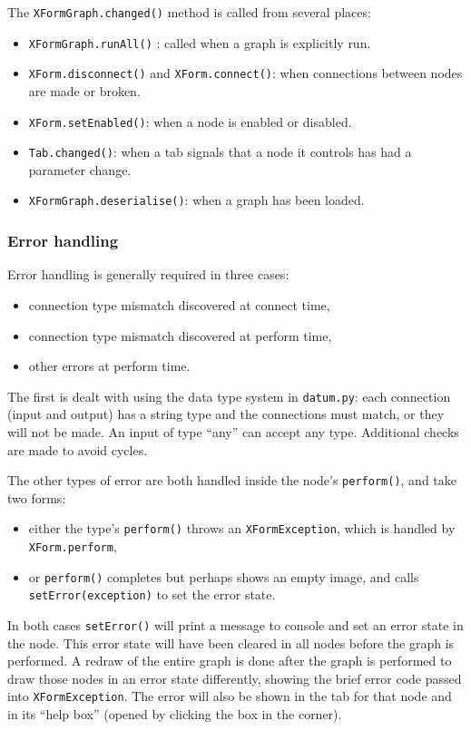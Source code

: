 The \texttt{XFormGraph.changed()} method is called from several places:
\begin{itemize}
\item \texttt{XFormGraph.runAll()} : called when a graph is explicitly run.
\item \texttt{XForm.disconnect()} and \texttt{XForm.connect()}: when connections between nodes are made or broken.
\item \texttt{XForm.setEnabled()}: when a node is enabled or disabled.
\item \texttt{Tab.changed()}: when a tab signals that a node it controls has had a parameter change.
\item \texttt{XFormGraph.deserialise()}: when a graph has been loaded.
\end{itemize}

\subsubsection{Error handling}
\label{errorhandling}
Error handling is generally required in three cases:
\begin{itemize}
\item connection type mismatch discovered at connect time,
\item connection type mismatch discovered at perform time,
\item other errors at perform time.
\end{itemize}
The first is dealt with using the data type system
in \texttt{datum.py}: each connection (input and output) has a string
type and the connections must match, or they will not be made. An input
of type ``any'' can accept any type. Additional checks are made to avoid
cycles.

The other types of error are both handled inside the node's \texttt{perform()},
and take two forms:
\begin{itemize}
\item either the type's \texttt{perform()} throws an \texttt{XFormException}, which
is handled by \texttt{XForm.perform},
\item or \texttt{perform()} completes but perhaps shows an empty image,
and calls \texttt{setError(exception)} to set the error state.
\end{itemize}
In both cases \texttt{setError()} will print a message to console and
set an error state in the node. This error state
will have been cleared in all nodes before the graph is performed. A redraw of the
entire graph is done after the graph is performed to
draw those nodes in an error state differently, showing the 
brief error code passed into \texttt{XFormException}. The error
will also be shown in the tab for that node and in its ``help box''
(opened by clicking the box in the corner).

